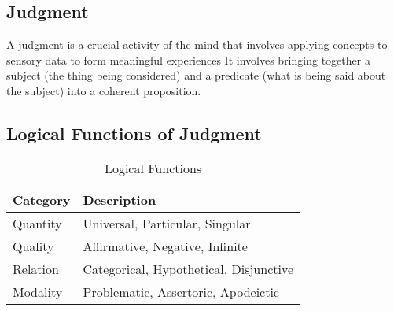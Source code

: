 \documentclass[a4paper]{article}
\begin{document}
\subsection{Judgment}
A judgment is a crucial activity of the mind that involves applying concepts to sensory data to form meaningful experiences
It involves bringing together a subject (the thing being considered) and a predicate (what is being said about the subject) into a coherent proposition.


\subsection{Logical Functions of Judgment}

\begin{table}[h!]
    \centering
    \begin{tabular}{|p{2cm}|p{10cm}|}
    \hline
    \textbf{Category} & \textbf{Description} \\
    \hline
    Quantity & Universal, Particular, Singular \\
    \hline
    Quality & Affirmative, Negative, Infinite \\
    \hline
    Relation & Categorical, Hypothetical, Disjunctive \\
    \hline
    Modality & Problematic, Assertoric, Apodeictic \\
    \hline
    \end{tabular}
    \caption{Logical Functions}
    \label{tab:categories}
    \end{table}
\end{document}
